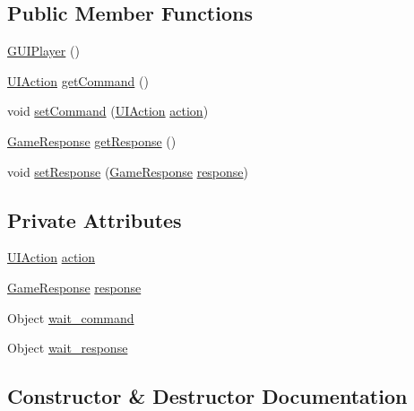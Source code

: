 \subsection*{Public Member Functions}
\begin{DoxyCompactItemize}
\item 
\mbox{\hyperlink{classplayer_1_1_g_u_i_player_a80239c9ccd4d9979e1831eccf690fc1d}{G\+U\+I\+Player}} ()
\item 
\mbox{\hyperlink{classui_1_1_u_i_action}{U\+I\+Action}} \mbox{\hyperlink{classplayer_1_1_g_u_i_player_a21dfc86265d20c079e048c9cd725eccf}{get\+Command}} ()
\item 
void \mbox{\hyperlink{classplayer_1_1_g_u_i_player_a1e0814130235ac601f2817932e1fd195}{set\+Command}} (\mbox{\hyperlink{classui_1_1_u_i_action}{U\+I\+Action}} \mbox{\hyperlink{classplayer_1_1_g_u_i_player_a1e0e2afb6ae8a00fd7230253267020ee}{action}})
\item 
\mbox{\hyperlink{classui_1_1_game_response}{Game\+Response}} \mbox{\hyperlink{classplayer_1_1_g_u_i_player_afa272be2d785f44914b4529ebdf88bd9}{get\+Response}} ()
\item 
void \mbox{\hyperlink{classplayer_1_1_g_u_i_player_aaaa7d3f93324b2bef898fa2b6c3da8bd}{set\+Response}} (\mbox{\hyperlink{classui_1_1_game_response}{Game\+Response}} \mbox{\hyperlink{classplayer_1_1_g_u_i_player_a2ad8e45fa561863d6469c932715e587c}{response}})
\end{DoxyCompactItemize}
\subsection*{Private Attributes}
\begin{DoxyCompactItemize}
\item 
\mbox{\hyperlink{classui_1_1_u_i_action}{U\+I\+Action}} \mbox{\hyperlink{classplayer_1_1_g_u_i_player_a1e0e2afb6ae8a00fd7230253267020ee}{action}}
\item 
\mbox{\hyperlink{classui_1_1_game_response}{Game\+Response}} \mbox{\hyperlink{classplayer_1_1_g_u_i_player_a2ad8e45fa561863d6469c932715e587c}{response}}
\item 
Object \mbox{\hyperlink{classplayer_1_1_g_u_i_player_a0b99cdbf51824fdf433647c6e96b3466}{wait\+\_\+command}}
\item 
Object \mbox{\hyperlink{classplayer_1_1_g_u_i_player_a39aa84dd9b23a47fe2f06bc7e3ccafce}{wait\+\_\+response}}
\end{DoxyCompactItemize}


\subsection{Constructor \& Destructor Documentation}
\mbox{\label{classplayer_1_1_g_u_i_player_a80239c9ccd4d9979e1831eccf690fc1d}} 
